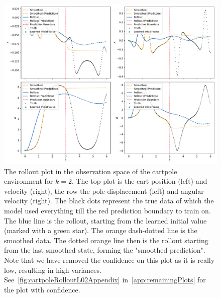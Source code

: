 		\begin{figure}
			\centering
			\includegraphics[width=\linewidth]{figures/results/cartpole-gym/run-latent-dim-02/without-confidence/rollout-observations-N0.pdf}
			\caption{The rollout plot in the observation space of the cartpole environment for \(k = 2\). The top plot is the cart position (left) and velocity (right), the row the pole displacement (left) and angular velocity (right). The black dots represent the true data of which the model used everything till the red prediction boundary to train on. The blue line is the rollout, starting from the learned initial value (marked with a green star). The orange dash-dotted line is the smoothed data. The dotted orange line then is the rollout starting from the last smoothed state, forming the "smoothed prediction". Note that we have removed the confidence on this plot as it is really low, resulting in high variances. See~\autoref{fig:cartpoleRolloutL02Appendix} in~\autoref{app:remainingPlots} for the plot with confidence.}
			\label{fig:cartpoleRolloutL02}
		\end{figure}
